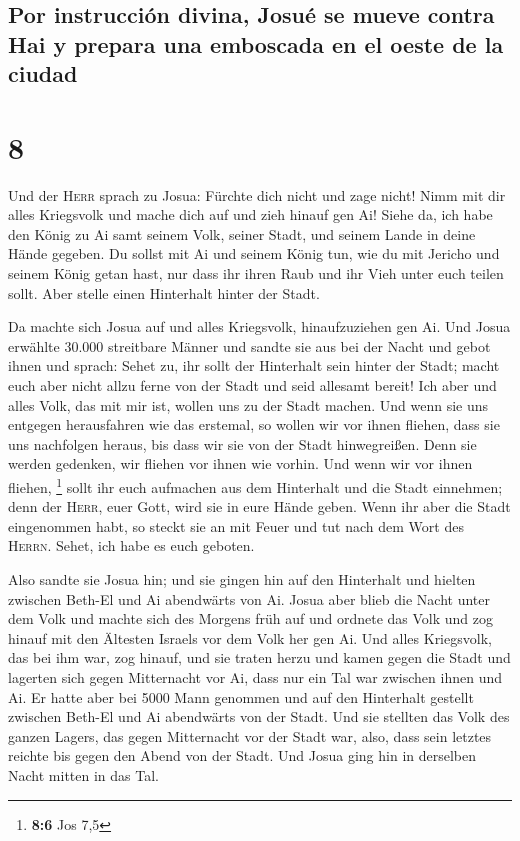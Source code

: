 \hypertarget{por-instrucciuxf3n-divina-josuuxe9-se-mueve-contra-hai-y-prepara-una-emboscada-en-el-oeste-de-la-ciudad}{%
\subsection{Por instrucción divina, Josué se mueve contra Hai y prepara
una emboscada en el oeste de la
ciudad}\label{por-instrucciuxf3n-divina-josuuxe9-se-mueve-contra-hai-y-prepara-una-emboscada-en-el-oeste-de-la-ciudad}}

\hypertarget{section-7}{%
\section{8}\label{section-7}}

 Und der \textsc{Herr} sprach zu Josua: Fürchte dich nicht
und zage nicht! Nimm mit dir alles Kriegsvolk und mache dich auf und
zieh hinauf gen Ai! Siehe da, ich habe den König zu Ai samt seinem Volk,
seiner Stadt, und seinem Lande in deine Hände gegeben.  Du
sollst mit Ai und seinem König tun, wie du mit Jericho und seinem König
getan hast, nur dass ihr ihren Raub und ihr Vieh unter euch teilen
sollt. Aber stelle einen Hinterhalt hinter der Stadt.

 Da machte sich Josua auf und alles Kriegsvolk,
hinaufzuziehen gen Ai. Und Josua erwählte 30.000 streitbare Männer und
sandte sie aus bei der Nacht  und gebot ihnen und sprach:
Sehet zu, ihr sollt der Hinterhalt sein hinter der Stadt; macht euch
aber nicht allzu ferne von der Stadt und seid allesamt bereit!
 Ich aber und alles Volk, das mit mir ist, wollen uns zu
der Stadt machen. Und wenn sie uns entgegen herausfahren wie das
erstemal, so wollen wir vor ihnen fliehen,  dass sie uns
nachfolgen heraus, bis dass wir sie von der Stadt hinwegreißen. Denn sie
werden gedenken, wir fliehen vor ihnen wie vorhin. Und wenn wir vor
ihnen fliehen, \footnote{\textbf{8:6} Jos 7,5}  sollt ihr
euch aufmachen aus dem Hinterhalt und die Stadt einnehmen; denn der
\textsc{Herr}, euer Gott, wird sie in eure Hände geben. 
Wenn ihr aber die Stadt eingenommen habt, so steckt sie an mit Feuer und
tut nach dem Wort des \textsc{Herrn}. Sehet, ich habe es euch geboten.

 Also sandte sie Josua hin; und sie gingen hin auf den
Hinterhalt und hielten zwischen Beth-El und Ai abendwärts von Ai. Josua
aber blieb die Nacht unter dem Volk  und machte sich des
Morgens früh auf und ordnete das Volk und zog hinauf mit den Ältesten
Israels vor dem Volk her gen Ai.  Und alles Kriegsvolk,
das bei ihm war, zog hinauf, und sie traten herzu und kamen gegen die
Stadt und lagerten sich gegen Mitternacht vor Ai, dass nur ein Tal war
zwischen ihnen und Ai.  Er hatte aber bei 5000 Mann
genommen und auf den Hinterhalt gestellt zwischen Beth-El und Ai
abendwärts von der Stadt.  Und sie stellten das Volk des
ganzen Lagers, das gegen Mitternacht vor der Stadt war, also, dass sein
letztes reichte bis gegen den Abend von der Stadt. Und Josua ging hin in
derselben Nacht mitten in das Tal.


